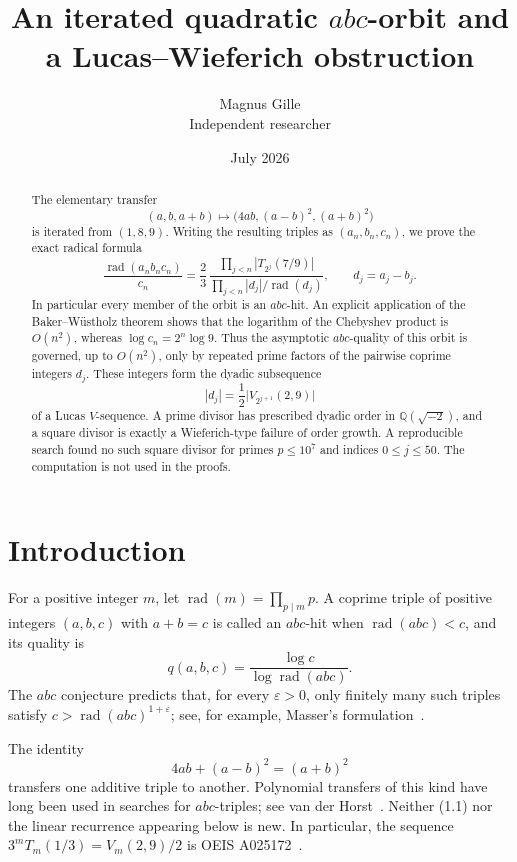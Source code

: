 \documentclass[11pt]{article}
\title{An iterated quadratic \(abc\)-orbit and a Lucas--Wieferich obstruction}
\author{Magnus Gille\\Independent researcher}
\date{July 2026}
\theoremstyle{remark}
\newcommand{\rad}{\operatorname{rad}}
\newcommand{\QQ}{\mathbb{Q}}
\begin{document}
\maketitle

\begin{abstract}
The elementary transfer
\[
 (a,b,a+b)\longmapsto\bigl(4ab,(a-b)^2,(a+b)^2\bigr)
\]
is iterated from \((1,8,9)\).  Writing the resulting triples as
\((a_n,b_n,c_n)\), we prove the exact radical formula
\[
 \frac{\rad(a_nb_nc_n)}{c_n}
 =\frac{2}{3}\,
   \frac{\prod_{j<n}|T_{2^j}(7/9)|}
        {\prod_{j<n}|d_j|/\rad(d_j)},\qquad d_j=a_j-b_j.
\]
In particular every member of the orbit is an \(abc\)-hit.  An explicit
application of the Baker--Wüstholz theorem shows that the logarithm of the
Chebyshev product is \(O(n^2)\), whereas \(\log c_n=2^n\log 9\).  Thus the
asymptotic \(abc\)-quality of this orbit is governed, up to \(O(n^2)\), only
by repeated prime factors of the pairwise coprime integers \(d_j\).
These integers form the dyadic subsequence
\[
 |d_j|=\frac12\bigl|V_{2^{j+1}}(2,9)\bigr|
\]
of a Lucas \(V\)-sequence.  A prime divisor has prescribed dyadic order in
\(\QQ(\sqrt{-2})\), and a square divisor is exactly a Wieferich-type failure
of order growth.  A reproducible search found no such square divisor for
primes \(p\leq 10^7\) and indices \(0\leq j\leq50\).  The computation is
not used in the proofs.
\end{abstract}

\section{Introduction}

For a positive integer \(m\), let
\(\rad(m)=\prod_{p\mid m}p\).  A coprime triple of positive integers
\((a,b,c)\) with \(a+b=c\) is called an \(abc\)-hit when
\(\rad(abc)<c\), and its quality is
\[
 q(a,b,c)=\frac{\log c}{\log\rad(abc)}.
\]
The \(abc\) conjecture predicts that, for every \(\varepsilon>0\), only
finitely many such triples satisfy \(c>\rad(abc)^{1+\varepsilon}\);
see, for example, Masser's formulation~\cite{Masser1985}.

The identity
\[
 4ab+(a-b)^2=(a+b)^2                                      \tag{1.1}
\]
transfers one additive triple to another.  Polynomial transfers of this
kind have long been used in searches for \(abc\)-triples; see van der
Horst~\cite[\S2.3]{vanderHorst2010}.  Neither (1.1) nor the linear
recurrence appearing below is new.  In particular, the sequence
\(3^mT_m(1/3)=V_m(2,9)/2\) is OEIS A025172~\cite{OEIS-A025172}.
\end{document}
